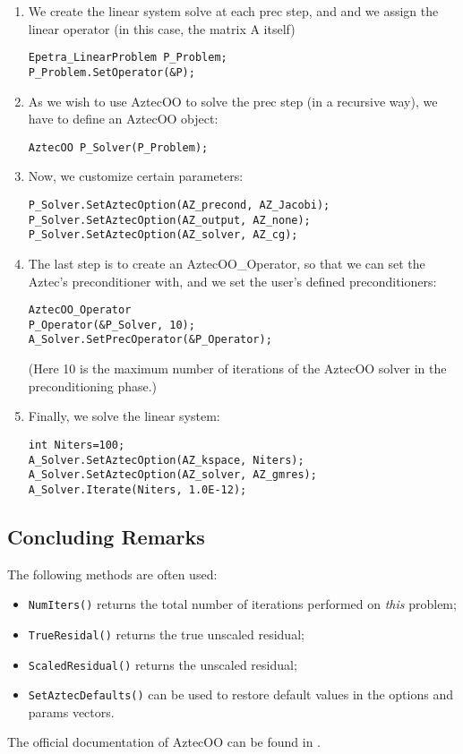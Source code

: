 \begin{enumerate}
\item We create the linear system solve at each prec step, and and we
  assign the linear operator (in this case, the matrix A itself)
\begin{verbatim}
Epetra_LinearProblem P_Problem;
P_Problem.SetOperator(&P);
\end{verbatim}
\item As we wish to use AztecOO to solve the prec step (in a recursive
  way), we have to define an AztecOO object:
\begin{verbatim}
AztecOO P_Solver(P_Problem);  
\end{verbatim}
\item Now, we customize certain parameters:
\begin{verbatim}
P_Solver.SetAztecOption(AZ_precond, AZ_Jacobi);
P_Solver.SetAztecOption(AZ_output, AZ_none);
P_Solver.SetAztecOption(AZ_solver, AZ_cg);
\end{verbatim}
\item The last step is to create an AztecOO\_Operator, so that we can set
  the Aztec's preconditioner with, and we set the user's defined
  preconditioners:
\begin{verbatim}
AztecOO_Operator
P_Operator(&P_Solver, 10);  
A_Solver.SetPrecOperator(&P_Operator);
\end{verbatim}
(Here 10 is the maximum number of iterations of the AztecOO solver in
the preconditioning phase.)
\item Finally, we solve the linear system:
\begin{verbatim}
int Niters=100;
A_Solver.SetAztecOption(AZ_kspace, Niters);
A_Solver.SetAztecOption(AZ_solver, AZ_gmres);
A_Solver.Iterate(Niters, 1.0E-12);  
\end{verbatim}
\end{enumerate}


\subsection{Concluding Remarks}

The following methods are often used:
\begin{itemize}
\item \verb!NumIters()! returns the total number of iterations performed
  on {\sl this} problem;
\item \verb!TrueResidal()! returns the true unscaled residual;
\item \verb!ScaledResidual()! returns the unscaled residual;
\item \verb!SetAztecDefaults()! can be used to restore default values in
  the options and params vectors.
\end{itemize}

The official documentation of AztecOO can be found in
\cite{AztecOO-Users-Guide}.

